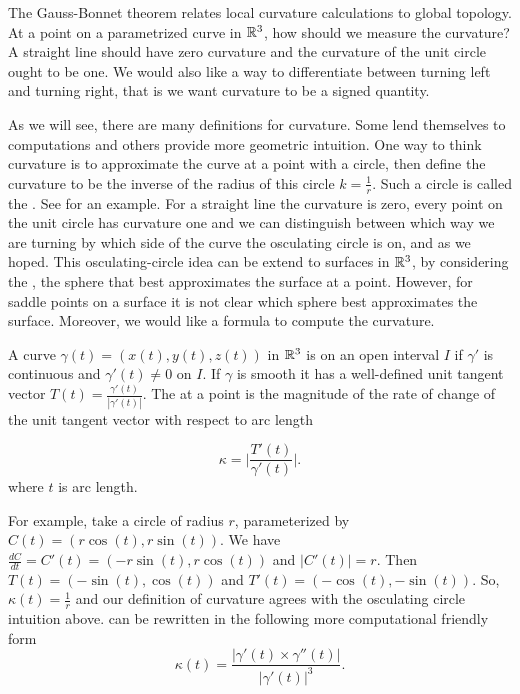 
The Gauss-Bonnet theorem relates local curvature calculations
to global topology. 
At a point on a parametrized curve  in $\mathbb{R}^3$,
how should we measure the curvature?
A straight line should have zero curvature and the curvature of the unit circle ought to be one.
We would also like a way to differentiate
between turning left and turning right, that is we want curvature to be a signed quantity.

As we will see, there are many definitions for curvature.
Some lend themselves to computations and others provide
more geometric intuition.
One way to think curvature is to approximate the curve at a point with a circle,
then define the curvature to be the inverse of the radius of this circle $k=\frac{1}{r}$.
Such a circle is called the .
See  for an example.
For a straight line the curvature is zero, 
every point on the unit circle has curvature one 
and we can distinguish between
which way we are turning by which side of the curve the osculating circle is on,
 and as we hoped.
 This osculating-circle idea can be extend
to  surfaces in $\mathbb{R}^3$, by considering the ,
 the sphere that best approximates the surface at a point.
However, for saddle points on a surface it is not clear which sphere
best approximates the surface. Moreover, we would like a formula to compute the curvature.

A curve $\gamma(t)=(x(t),y(t),z(t))$ in $\mathbb{R}^3$ is  on an open interval $I$
if $\gamma'$ is continuous and $\gamma'(t)\neq 0$ on $I$. 
If $\gamma$ is smooth it has a well-defined unit tangent vector $T(t)=\frac{\gamma'(t)}{|\gamma'(t)|}.$
The  at a point is the magnitude of the rate of change of the unit tangent vector with 
respect to arc length

\begin{equation} \label{eqn:kappa}
\kappa=\bigg  | \frac{T'(t)}{\gamma'(t)}\bigg |.
\end{equation}
where $t$ is arc length.

For example, take a circle of radius $r$, parameterized by $C(t)=\left(r\cos(t),r\sin(t)\right)$.
We have $\frac{dC}{dt}=C'(t)=\left(-r\sin(t),r\cos(t)\right)$ and $|C'(t)|=r$.
Then $T(t)=\left(-\sin(t),\cos(t)\right)$ and $T'(t)=\left(-\cos(t),-\sin(t)\right)$.
So, $\kappa(t)=\frac{1}{r}$ and our definition of curvature agrees with the
osculating circle intuition above. 
 can be rewritten in the following more computational friendly form 
\begin{equation} \label{eqn:kappa1}
\kappa(t)=\frac{|\gamma'(t)\times \gamma''(t)|}{|\gamma'(t)|^3}.
\end{equation}

